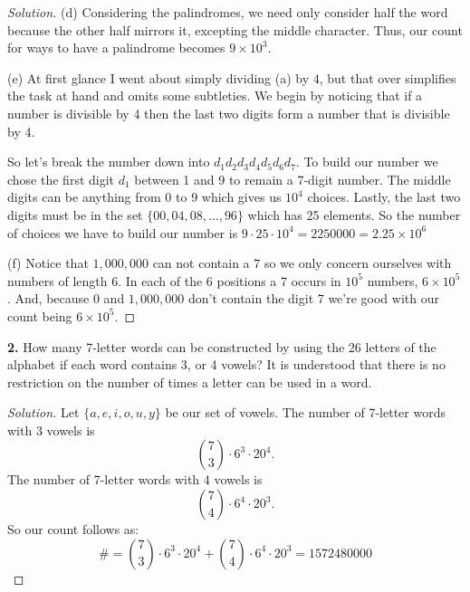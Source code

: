 \documentclass[12pt]{amsart}
\newenvironment{solution}
{\begin{proof}[Solution]}
{\end{proof}}
\begin{document}
\begin{onehalfspace}
\begin{solution}
            (d) Considering the palindromes, we need only consider half the word because the other half mirrors it,
            excepting the middle character.
            Thus, our count for ways to have a palindrome becomes $9\times10^3$.

            (e) At first glance I went about simply dividing (a) by $4$, but that over simplifies the task at hand and
            omits some subtleties.
            We begin by noticing that if a number is divisible by 4 then the last two digits form a number that is
            divisible by 4.

            So let's break the number down into $d_1 d_2 d_3 d_4 d_5 d_6 d_7$.
            To build our number we chose the first digit $d_1$ between 1 and 9 to remain a 7-digit number.
            The middle digits can be anything from 0 to 9 which gives us $10^4$ choices.
            Lastly, the last two digits must be in the set $\{00,04,08,\ldots,96\}$ which has 25 elements.
            So the number of choices we have to build our number is $9\cdot25\cdot10^4 = 2250000=2.25\times10^6$

            (f) Notice that $1,000,000$ can not contain a $7$ so we only concern ourselves with numbers
            of length 6.
            In each of the 6 positions a 7 occurs in $10^5$ numbers, $6\times10^5$.
            And, because 0 and $1,000,000$ don't contain the digit 7 we're good with our count being $6\times10^5$.
        \end{solution}

        \noindent\textbf{2.} How many 7-letter words can be constructed by using the 26 letters of the alphabet if
        each word contains 3, or 4 vowels?
        It is understood that there is no restriction on the number of times a letter can be used in a word.
        \begin{solution}
            Let $\{a,e,i,o,u,y\}$ be our set of vowels.
            The number of 7-letter words with 3 vowels is
            \begin{displaymath}
                \binom{7}{3}\cdot 6^3 \cdot20^4.
            \end{displaymath}
            The number of 7-letter words with 4 vowels is
            \begin{displaymath}
                \binom{7}{4}\cdot 6^4 \cdot20^3.
            \end{displaymath}
            So our count follows as:
            \begin{displaymath}
                \#=\binom{7}{3}\cdot6^3\cdot 20^4 + \binom{7}{4}\cdot 6^4\cdot 20^3 = 1572480000
            \end{displaymath}
        \end{solution}


\end{onehalfspace}
\end{document}
